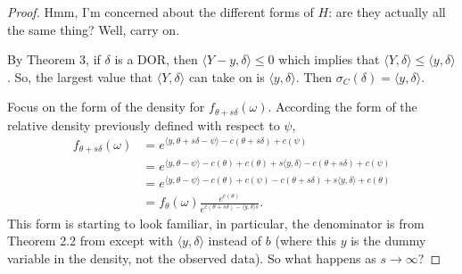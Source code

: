 \documentclass{amsbook}
\newcommand{\inner}[1]{\langle #1 \rangle}
\theoremstyle{definition}
\theoremstyle{remark}
\begin{document}
\begin{proof}
Hmm, I'm concerned about the different forms of $H$: are they actually all the same 
thing?  Well, carry on.

By Theorem 3, if $\delta$ is a DOR, then $\inner{Y-y, \delta} \leq 0$ which implies 
that $\inner{Y, \delta} \leq \inner{y, \delta}$.  So, the largest value that $\inner
{Y, \delta}$ can take on is $\inner{y, \delta}$.  Then $\sigma_C(\delta) = \inner{y, 
\delta}$.

Focus on the form of the density for $f_{\theta+s\delta}(\omega)$.  According the 
form of the relative density previously defined with respect to $\psi$,
\begin{align*}
 f_{\theta+s\delta}(\omega) &= e^{ \inner{y,\theta+s\delta - \psi} - c(\theta+s
\delta) + c(\psi)  } \\
 	&= e^{ \inner{y,\theta - \psi} -c(\theta) + c(\theta) + s \inner{y,\delta} - c
(\theta+s\delta) + c(\psi)  } \\
 	&= e^{ \inner{y,\theta - \psi} -c(\theta) + c(\psi) - c(\theta+s\delta) + s 
\inner{y,\delta} + c(\theta)   } \\
 	&= f_\theta(\omega) \frac{e^{c(\theta)}}{e^{ c(\theta+s\delta) - \inner{y,\delta}
s } }.
\end{align*}
This form is starting to look familiar, in particular, the denominator is from 
Theorem 2.2 from \citet{Geyer:1990} except with $\inner{y,\delta}$ instead of $b$ 
(where this 
$y$ is the dummy variable in the density, not the observed data).  So what happens as 
$s \to \infty$?  


\end{proof}
\end{document}
